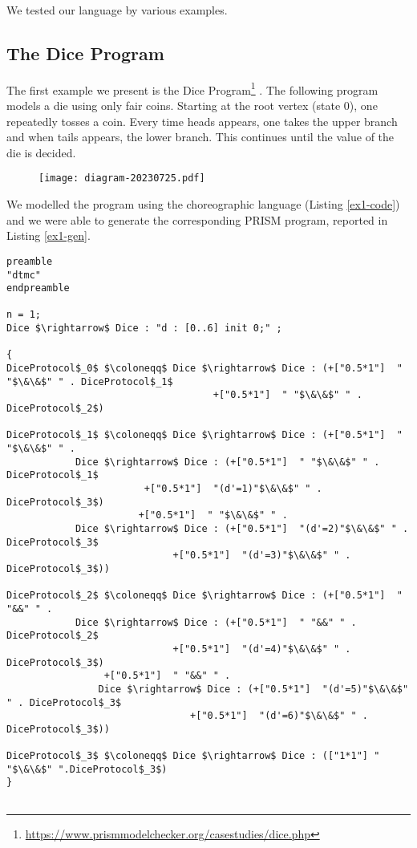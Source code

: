 We tested our language by various examples.

\subsection{The Dice Program}
 The first example we present is the Dice Program\footnote{\url{https://www.prismmodelchecker.org/casestudies/dice.php}} \cite{KY76}. The following program models a die using only fair coins. Starting at the root vertex (state 0), one repeatedly tosses a coin. Every time heads appears, one takes the upper branch and when tails appears, the lower branch. This continues until the value of the die is decided.


\begin{figure}[h]
\centering
\texttt{[image: diagram-20230725.pdf]}	
\end{figure}

We modelled the program using the choreographic language (Listing \ref{ex1-code}) and we were able to generate the corresponding PRISM program, reported in Listing \ref{ex1-gen}.

\begin{lstlisting}[style=chor-color,caption={Choreographic language for the Dice Program.},captionpos=b,label={ex1-code}]
preamble
"dtmc"
endpreamble

n = 1;
Dice $\rightarrow$ Dice : "d : [0..6] init 0;" ;

{
DiceProtocol$_0$ $\coloneqq$ Dice $\rightarrow$ Dice : (+["0.5*1"]  " "$\&\&$" " . DiceProtocol$_1$
                                    +["0.5*1"]  " "$\&\&$" " .  DiceProtocol$_2$)

DiceProtocol$_1$ $\coloneqq$ Dice $\rightarrow$ Dice : (+["0.5*1"]  " "$\&\&$" " . 
 			Dice $\rightarrow$ Dice : (+["0.5*1"]  " "$\&\&$" " . DiceProtocol$_1$
           	 		 	+["0.5*1"]  "(d'=1)"$\&\&$" " . DiceProtocol$_3$)
     				   +["0.5*1"]  " "$\&\&$" " .  
   			Dice $\rightarrow$ Dice : (+["0.5*1"]  "(d'=2)"$\&\&$" " . DiceProtocol$_3$
           	 		         +["0.5*1"]  "(d'=3)"$\&\&$" " . DiceProtocol$_3$))

DiceProtocol$_2$ $\coloneqq$ Dice $\rightarrow$ Dice : (+["0.5*1"]  " "&&" " . 
	 		Dice $\rightarrow$ Dice : (+["0.5*1"]  " "&&" " . DiceProtocol$_2$
	 	                	 +["0.5*1"]  "(d'=4)"$\&\&$" " . DiceProtocol$_3$)
	 			 +["0.5*1"]  " "&&" " . 
	    		Dice $\rightarrow$ Dice : (+["0.5*1"]  "(d'=5)"$\&\&$" " . DiceProtocol$_3$
	                     		+["0.5*1"]  "(d'=6)"$\&\&$" " . DiceProtocol$_3$))

DiceProtocol$_3$ $\coloneqq$ Dice $\rightarrow$ Dice : (["1*1"] " "$\&\&$" ".DiceProtocol$_3$)
}
	
\end{lstlisting}


